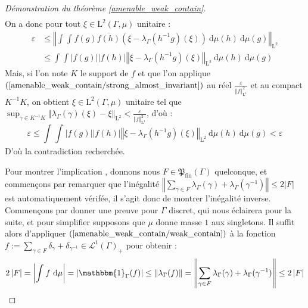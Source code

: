 \documentclass[a4paper,12pt]{article}
\newcommand{\norm}[1]{\left\Vert #1\right\Vert}
\newcommand{\abs}[1]{\left\vert#1\right\vert}
\newcommand{\card}[1]{\abs{#1}}
\newcommand{\indic}{\mathbbm{1}}
\newcommand{\integral}[4]{\int_{#1}^{#2} #3~\mathrm{d}#4}
\newcommand{\inv}{^{-1}}
\renewcommand{\implies}{\Rightarrow}
\newcommand{\finparts}{\mathfrak{P}_{\mathrm{fin}}}
\begin{document}
\begin{proof}[Démonstration du théorème \ref{amenable_weak_contain}]
\begin{align*}
    \end{align*}
    On a donc pour tout $\xi\in\mathrm{L}^2(\Gamma, \mu)$ unitaire :
    \begin{align*}
        \varepsilon 
            &\le \norm{\integral{}{}{\integral{}{}{f(g)\overline{f(h)}(\xi - \lambda_\Gamma(h\inv g)(\xi))}{\mu(h)}}{\mu(g)}}_{\mathrm{L}^2} \\
            &\le \integral{}{}{\integral{}{}{\abs{f(g)}\abs{f(h)}\norm{\xi - \lambda_\Gamma(h\inv g)(\xi)}_{\mathrm{L}^2}}{\mu(h)}}{\mu(g)}
    \end{align*}
    Mais, si l'on note $K$ le support de $f$ et que l'on applique $(\ref{amenable_weak_contain/strong_almost_invariant})$ au réel $\frac{\varepsilon}{\norm{f}_{\mathrm{L}^1}^2}$ et au compact $K\inv K$,
    on obtient $\xi\in\mathrm{L}^2(\Gamma, \mu)$ unitaire tel que $\sup_{\gamma\in K\inv K} \norm{\lambda_\Gamma(\gamma)(\xi) - \xi}_{\mathrm{L}^2}<\frac{\varepsilon}{\norm{f}_{\mathrm{L}^1}^2}$, d'où :
    \begin{equation*}
        \varepsilon
            \le \integral{}{}{\integral{}{}{\abs{f(g)}\abs{f(h)}\norm{\xi - \lambda_\Gamma(h\inv g)(\xi)}_{\mathrm{L}^2}}{\mu(h)}}{\mu(g)} 
            < \varepsilon
    \end{equation*}
    D'où la contradiction recherchée.

    Pour montrer l'implication \framebox{$(\ref{amenable_weak_contain/weak_contain})\implies(\ref{amenable_weak_contain/norm_eq_two})$}, donnons nous 
    $F\in\finparts(\Gamma)$ quelconque, et commençons par remarquer 
    que l'inégalité $\norm{\sum_{\gamma\in F}\lambda_\Gamma(\gamma)+\lambda_\Gamma(\gamma\inv)} \le 2\card{F}$ est automatiquement vérifée, il s'agit donc de montrer l'inégalité 
    inverse. Commençons par donner une preuve pour $\Gamma$ discret, qui nous éclairera pour la suite, et pour simplifier supposons
    que $\mu$ donne masse $1$ aux singletons. Il suffit alors d'appliquer $(\ref{amenable_weak_contain/weak_contain})$
    à la fonction $f := \sum_{\gamma\in F}\delta_\gamma + \delta_{\gamma\inv}\in\mathscr{L}^1(\Gamma)_{+}$ pour obtenir :
    \begin{equation*}
        2\card{F} = \abs{\integral{}{}{f}{\mu}} = \abs{\indic_\Gamma(f)} \le \norm{\lambda_\Gamma(f)} = \norm{\sum_{\gamma\in F}\lambda_\Gamma(\gamma)+\lambda_\Gamma(\gamma\inv)}\le2\card{F}
    \end{equation*}


\end{proof}
\end{document}
